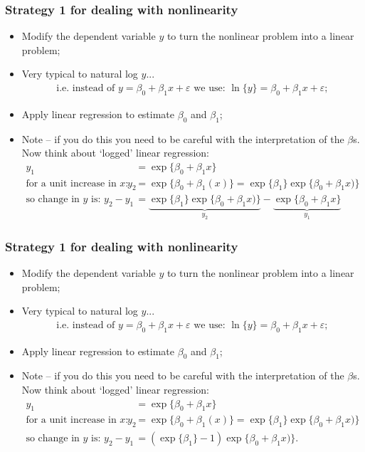 \documentclass[aspectratio=169]{beamer}
\theoremstyle{principle}
\begin{document}
\begin{frame}
\frametitle{Strategy 1 for dealing with nonlinearity}

\begin{itemize}
\item Modify the dependent variable $y$ to turn the nonlinear problem into a linear problem;
\item Very typical to natural log $y$...
\begin{align*}
\mbox{i.e. instead of }y = \beta_0 + \beta_1x + \varepsilon\mbox{ we use: }\ln\{y\} = \beta_0 + \beta_1x + \varepsilon;
\end{align*}
\item Apply linear regression to estimate $\beta_0$ and $\beta_1$;
\item Note -- if you do this you need to be careful with the interpretation of the $\beta$s.  Now think about `logged' linear regression:
\begin{align*}
y_1 &= \exp\{\beta_0 + \beta_1x\}\\
\mbox{for a unit increase in $x$: } y_2 &= \exp\{\beta_0 + \beta_1(x)\} = \exp\{\beta_1\}\exp\{\beta_0 + \beta_1x)\}\\
\mbox{so change in $y$ is: }y_2 - y_1 &= \underbrace{\exp\{\beta_1\}\exp\{\beta_0 + \beta_1x)\}}_{y_2} - \underbrace{\exp\{\beta_0 + \beta_1x\}}_{y_1}
\end{align*}

\end{itemize}

\end{frame}

\begin{frame}
\frametitle{Strategy 1 for dealing with nonlinearity}

\begin{itemize}
\item Modify the dependent variable $y$ to turn the nonlinear problem into a linear problem;
\item Very typical to natural log $y$...
\begin{align*}
\mbox{i.e. instead of }y = \beta_0 + \beta_1x + \varepsilon\mbox{ we use: }\ln\{y\} = \beta_0 + \beta_1x + \varepsilon;
\end{align*}
\item Apply linear regression to estimate $\beta_0$ and $\beta_1$;
\item Note -- if you do this you need to be careful with the interpretation of the $\beta$s.  Now think about `logged' linear regression:
\begin{align*}
y_1 &= \exp\{\beta_0 + \beta_1x\}\\
\mbox{for a unit increase in $x$: } y_2 &= \exp\{\beta_0 + \beta_1(x)\} = \exp\{\beta_1\}\exp\{\beta_0 + \beta_1x)\}\\
\mbox{so change in $y$ is: }y_2 - y_1 &= (\exp\{\beta_1\}  - 1)\exp\{\beta_0 + \beta_1x)\}.
\end{align*}

\end{itemize}

\end{frame}
\end{document}
